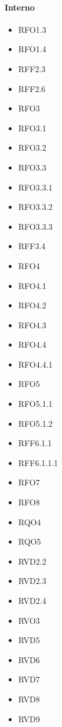 \paragraph{Interno}
\quad
\begin{multicols}{3}
    \begin{itemize}
        \item RFO1.3
        \item RFO1.4
        \item RFF2.3
        \item RFF2.6
        \item RFO3
        \item RFO3.1
        \item RFO3.2
        \item RFO3.3
        \item RFO3.3.1
        \item RFO3.3.2
        \item RFO3.3.3
        \item RFF3.4
        \item RFO4
        \item RFO4.1
        \item RFO4.2
        \item RFO4.3
        \item RFO4.4
        \item RFO4.4.1
        \item RFO5
        \item RFO5.1.1
        \item RFO5.1.2
        \item RFF6.1.1
        \item RFF6.1.1.1
        \item RFO7
        \item RFO8
        \item RQO4
        \item RQO5
        \item RVD2.2
        \item RVD2.3
        \item RVD2.4
        \item RVO3
        \item RVD5
        \item RVD6
        \item RVD7
        \item RVD8
        \item RVD9
    \end{itemize}
\end{multicols}

